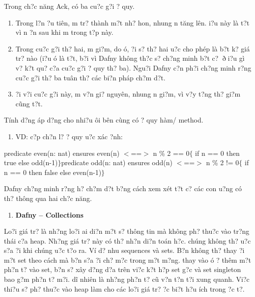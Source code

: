 \documentclass{article} %
\begin{document}
\noindent Trong ch?c n\u{a}ng Ack, c\'{o} ba cu?c g?i {\dj}? quy. \textbf{}

\begin{enumerate}
\item \textbf{ }Trong l?n {\dj}?u ti\^{e}n, m tr? th\`{a}nh m?t nh? hon, nhung n t\u{a}ng l\^{e}n. {\DJ}i?u n\`{a}y l\`{a} t?t v\`{i} n {\dj}?n sau khi m trong t?p n\`{a}y. 

\item  Trong cu?c g?i th? hai, m gi?m, do {\dj}\'{o}, {\dj}?i s? th? hai {\dj}u?c cho ph\'{e}p l\`{a} b?t k? gi\'{a} tr? n\`{a}o ({\dj}i?u {\dj}\'{o} l\`{a} t?t, b?i v\`{i} Dafny kh\^{o}ng th?c s? ch?ng minh b?t c? $\mathrm{\eth}$i?u g\`{i} v? k?t qu? c?a cu?c g?i {\dj}? quy th? ba). Ngu?i Dafny c?n ph?i ch?ng minh r?ng cu?c g?i th? ba tu\^{a}n th? c\'{a}c bi?n ph\'{a}p ch?m d?t.

\item  {\DJ}?i v?i cu?c g?i n\`{a}y, m v?n gi? nguy\^{e}n, nhung n gi?m, v\`{i} v?y t?ng th? gi?m c\~{u}ng t?t.
\end{enumerate}

\noindent T\'{i}nh d?ng \'{a}p d?ng cho nhi?u {\dj}\^{o}i b\^{e}n c\`{u}ng c\'{o} {\dj}? quy h\`{a}m/ method.

\begin{enumerate}
\item  VD: c?p ch?n l? {\dj}? quy {\dj}u?c x\'{a}c {\dj}?nh:
\end{enumerate}

predicate even(n: nat)   ensures even(n) $<$==$>$ n \% 2 == 0$\{$   if n == 0 then true else odd(n-1)$\}$predicate odd(n: nat)   ensures odd(n) $<$==$>$ n \% 2 != 0$\{$   if n == 0 then false else even(n-1)$\}$\textbf{}

Dafny ch?ng minh r?ng h? ch?m d?t b?ng c\'{a}ch xem x\'{e}t t?t c? c\'{a}c con {\dj}u?ng c\'{o} th? th\^{o}ng qua hai ch?c n\u{a}ng.



\begin{enumerate}
\item  \textbf{Dafny -- Collections}
\end{enumerate}

Lo?i gi\'{a} tr? l\`{a} nh?ng lo?i {\dj}ai di?n m?t s? th\^{o}ng tin m\`{a} kh\^{o}ng ph? thu?c v\`{a}o tr?ng th\'{a}i c?a heap. Nh?ng gi\'{a} tr? n\`{a}y c\'{o} th? nh?n di?n to\'{a}n h?c. ch\'{u}ng kh\^{o}ng th? {\dj}u?c s?a {\dj}?i khi ch\'{u}ng {\dj}u?c t?o ra. V\'{i} d? nhu sequences v\`{a} sets. B?n kh\^{o}ng th? thay {\dj}?i m?t set theo c\'{a}ch m\`{a} b?n s?a {\dj}?i ch? m?c trong m?t m?ng. thay v\`{a}o {\dj}\'{o} {\dj}? th\^{e}m m?t ph?n t? v\`{a}o set, b?n s? x\^{a}y d?ng d?a tr\^{e}n vi?c k?t h?p set g?c v\`{a} set singleton bao g?m ph?n t? m?i. d\~{i} nhi\^{e}n l\`{a} nh?ng ph?n t? c\~{u} v?n t?n t?i xung quanh. Vi?c thi?u s? ph? thu?c v\`{a}o heap l\`{a}m cho c\'{a}c lo?i gi\'{a} tr? {\dj}?c bi?t h?u \'{i}ch trong {\dj}?c t?.
\end{document}
